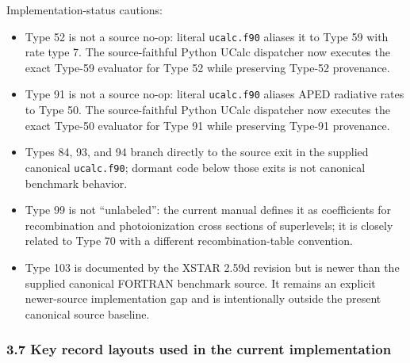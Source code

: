 \documentclass[
  10pt,
]{article}
\begin{document}
Implementation-status cautions:
\begin{itemize}
\item Type 52 is not a source no-op: literal \texttt{ucalc.f90} aliases it to Type 59 with rate type 7. The source-faithful Python UCalc dispatcher now executes the exact Type-59 evaluator for Type 52 while preserving Type-52 provenance.
\item Type 91 is not a source no-op: literal \texttt{ucalc.f90} aliases APED radiative rates to Type 50. The source-faithful Python UCalc dispatcher now executes the exact Type-50 evaluator for Type 91 while preserving Type-91 provenance.
\item Types 84, 93, and 94 branch directly to the source exit in the supplied canonical \texttt{ucalc.f90}; dormant code below those exits is not canonical benchmark behavior.
\item Type 99 is not ``unlabeled'': the current manual defines it as coefficients for recombination and photoionization cross sections of superlevels; it is closely related to Type 70 with a different recombination-table convention.
\item Type 103 is documented by the XSTAR 2.59d revision but is newer than the supplied canonical FORTRAN benchmark source. It remains an explicit newer-source implementation gap and is intentionally outside the present canonical source baseline.
\end{itemize}

\subsubsection{3.7 Key record layouts used in the current
implementation}\label{key-record-layouts-used-in-the-current-implementation}
\end{document}
